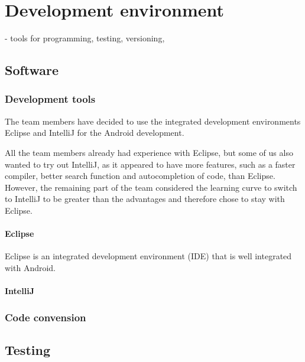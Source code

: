 \chapter{Development environment}
- tools for programming, testing, versioning, 

\section{Software}
\subsection{Development tools}

The team members have decided to use the  integrated development environments Eclipse and IntelliJ for the Android development. 

All the team members already had experience with Eclipse, but some of us also wanted to try out IntelliJ, as it appeared to have more features, such as a faster compiler, better search function and autocompletion of code, than Eclipse. However, the remaining part of the team considered the learning curve to switch to IntelliJ to be greater than the advantages and therefore chose to stay with Eclipse.

\subsubsection{Eclipse}
Eclipse is an integrated development environment (IDE) that is well integrated with Android.

\subsubsection{IntelliJ}
\subsection{Code convension}
\section{Testing}